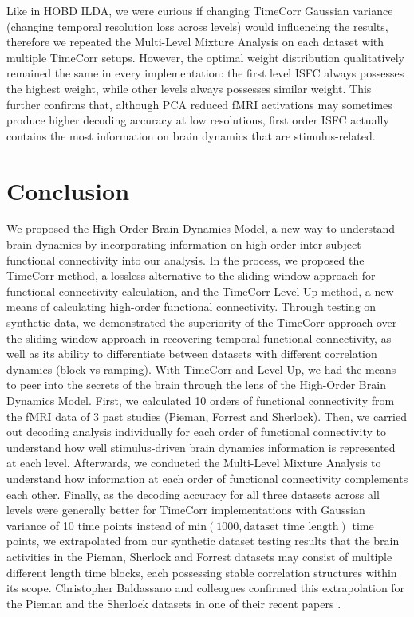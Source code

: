 \documentclass[11pt]{article}
\begin{document}
Like in HOBD ILDA, we were curious if changing TimeCorr Gaussian variance (changing temporal resolution loss across levels) would influencing the results, therefore we repeated the Multi-Level Mixture Analysis on each dataset with multiple TimeCorr setups. However, the optimal weight distribution qualitatively remained the same in every implementation: the first level ISFC always possesses the highest weight, while other levels always possesses similar weight. This further confirms that, although PCA reduced fMRI activations may sometimes produce higher decoding accuracy at low resolutions, first order ISFC actually contains the most information on brain dynamics that are stimulus-related.


\clearpage
\newpage
\section{Conclusion}
We proposed the High-Order Brain Dynamics Model, a new way to understand brain dynamics by incorporating information on high-order inter-subject functional connectivity into our analysis. In the process, we proposed the TimeCorr method, a lossless alternative to the sliding window approach for functional connectivity calculation, and the TimeCorr Level Up method, a new means of calculating high-order functional connectivity. Through testing on synthetic data, we demonstrated the superiority of the TimeCorr approach over the sliding window approach in recovering temporal functional connectivity, as well as its ability to differentiate between datasets with different correlation dynamics (block vs ramping). With TimeCorr and Level Up, we had the means to peer into the secrets of the brain through the lens of the High-Order Brain Dynamics Model. First, we calculated 10 orders of functional connectivity from the fMRI data of 3 past studies (Pieman, Forrest and Sherlock). Then, we carried out decoding analysis individually for each order of functional connectivity to understand how well stimulus-driven brain dynamics information is represented at each level. Afterwards, we conducted the Multi-Level Mixture Analysis to understand how information at each order of functional connectivity complements each other. Finally, as the decoding accuracy for all three datasets across all levels were generally better for TimeCorr implementations with Gaussian variance of 10 time points instead of $\text{min}(1000,\text{dataset time length})$ time points, we extrapolated from our synthetic dataset testing results that the brain activities in the Pieman, Sherlock and Forrest datasets may consist of multiple different length time blocks, each possessing stable correlation structures within its scope. Christopher Baldassano and colleagues confirmed this extrapolation for the Pieman and the Sherlock datasets in one of their recent papers \citep{Baldassano2016}.
\end{document}
